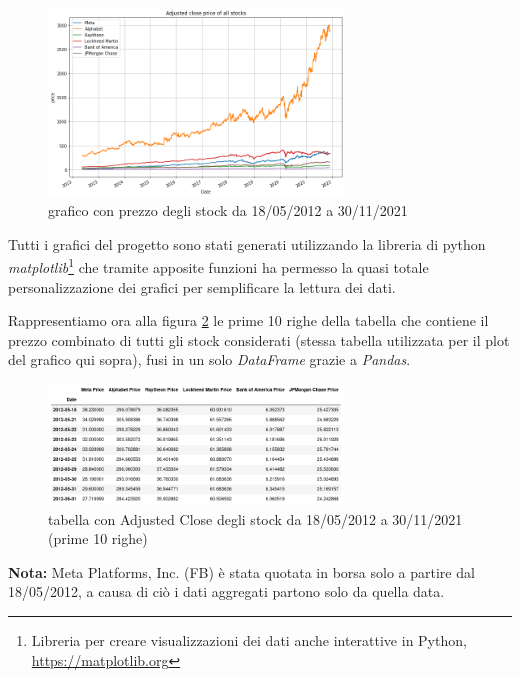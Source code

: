 \documentclass{article}
\begin{document}
\begin{figure}[h]
  \centering
  \includegraphics[width=0.7\textwidth]{all_stocks_price.png}
  \caption{grafico con prezzo degli stock da 18/05/2012 a 30/11/2021}
  \label{fig:all_stocks_price}
\end{figure}

Tutti i grafici del progetto sono stati generati utilizzando la libreria di python \emph{matplotlib}\footnote{Libreria per creare visualizzazioni dei dati anche interattive in Python, \href{https://matplotlib.org}{https://matplotlib.org}}
che tramite apposite funzioni ha permesso la quasi totale personalizzazione dei grafici per semplificare la lettura dei dati.

Rappresentiamo ora alla figura \ref{fig:all_stocks_table_10} le prime 10 righe della tabella che contiene il prezzo combinato di tutti gli stock considerati (stessa tabella utilizzata per il plot del grafico qui sopra), 
fusi in un solo \emph{DataFrame} grazie a \emph{Pandas}.

\begin{figure}[h]
  \centering
  \includegraphics[width=0.7\textwidth]{stocks_combined_first_10.png}
  \caption{tabella con Adjusted Close degli stock da 18/05/2012 a 30/11/2021 (prime 10 righe)}
  \label{fig:all_stocks_table_10}
\end{figure}

\textbf{Nota:} Meta Platforms, Inc. (FB) è stata quotata in borsa solo a partire dal 18/05/2012, a causa di ciò i dati aggregati partono
solo da quella data.
\end{document}
